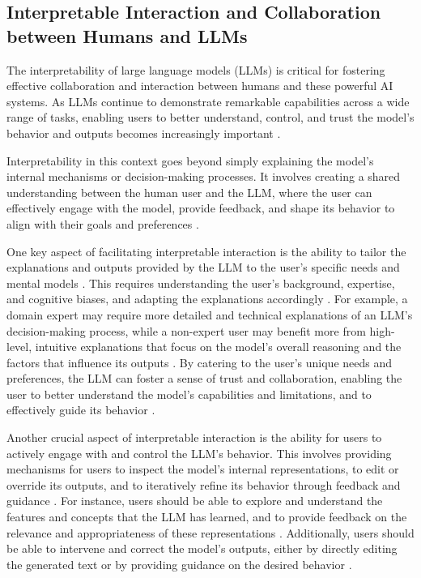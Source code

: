 \documentclass[11pt]{article}
\begin{document}
\subsection{Interpretable Interaction and Collaboration between Humans and LLMs}

The interpretability of large language models (LLMs) is critical for fostering effective collaboration and interaction between humans and these powerful AI systems. As LLMs continue to demonstrate remarkable capabilities across a wide range of tasks, enabling users to better understand, control, and trust the model's behavior and outputs becomes increasingly important \cite{ref241,ref279}.

Interpretability in this context goes beyond simply explaining the model's internal mechanisms or decision-making processes. It involves creating a shared understanding between the human user and the LLM, where the user can effectively engage with the model, provide feedback, and shape its behavior to align with their goals and preferences \cite{ref280,ref281}.

One key aspect of facilitating interpretable interaction is the ability to tailor the explanations and outputs provided by the LLM to the user's specific needs and mental models \cite{ref282}. This requires understanding the user's background, expertise, and cognitive biases, and adapting the explanations accordingly \cite{ref279}. For example, a domain expert may require more detailed and technical explanations of an LLM's decision-making process, while a non-expert user may benefit more from high-level, intuitive explanations that focus on the model's overall reasoning and the factors that influence its outputs \cite{ref283,ref284}. By catering to the user's unique needs and preferences, the LLM can foster a sense of trust and collaboration, enabling the user to better understand the model's capabilities and limitations, and to effectively guide its behavior \cite{ref188}.

Another crucial aspect of interpretable interaction is the ability for users to actively engage with and control the LLM's behavior. This involves providing mechanisms for users to inspect the model's internal representations, to edit or override its outputs, and to iteratively refine its behavior through feedback and guidance \cite{ref285,ref286}. For instance, users should be able to explore and understand the features and concepts that the LLM has learned, and to provide feedback on the relevance and appropriateness of these representations \cite{ref287}. Additionally, users should be able to intervene and correct the model's outputs, either by directly editing the generated text or by providing guidance on the desired behavior \cite{ref288,ref269}.
\end{document}
